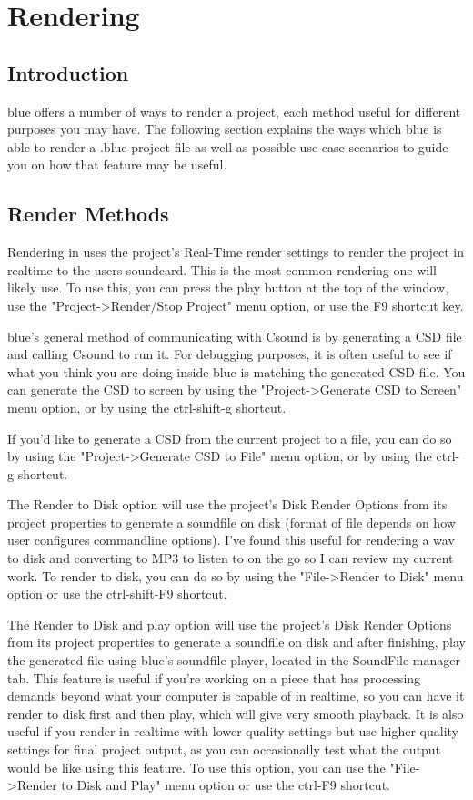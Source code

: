 \section{Rendering}\label{rendering}

\subsection{Introduction}

blue offers a number of ways to render a project, each method useful for
different purposes you may have. The following section explains the ways
which blue is able to render a .blue project file as well as possible
use-case scenarios to guide you on how that feature may be useful.

\subsection{Render Methods}

Rendering in uses the project's Real-Time render settings to render the
project in realtime to the users soundcard. This is the most common
rendering one will likely use. To use this, you can press the play
button at the top of the window, use the
"Project-\textgreater{}Render/Stop Project" menu option, or use the F9
shortcut key.

blue's general method of communicating with Csound is by generating a
CSD file and calling Csound to run it. For debugging purposes, it is
often useful to see if what you think you are doing inside blue is
matching the generated CSD file. You can generate the CSD to screen by
using the "Project-\textgreater{}Generate CSD to Screen" menu option, or
by using the ctrl-shift-g shortcut.

If you'd like to generate a CSD from the current project to a file, you
can do so by using the "Project-\textgreater{}Generate CSD to File" menu
option, or by using the ctrl-g shortcut.

The Render to Disk option will use the project's Disk Render Options
from its project properties to generate a soundfile on disk (format of
file depends on how user configures commandline options). I've found
this useful for rendering a wav to disk and converting to MP3 to listen
to on the go so I can review my current work. To render to disk, you can
do so by using the "File-\textgreater{}Render to Disk" menu option or
use the ctrl-shift-F9 shortcut.

The Render to Disk and play option will use the project's Disk Render
Options from its project properties to generate a soundfile on disk and
after finishing, play the generated file using blue's soundfile player,
located in the SoundFile manager tab. This feature is useful if you're
working on a piece that has processing demands beyond what your computer
is capable of in realtime, so you can have it render to disk first and
then play, which will give very smooth playback. It is also useful if
you render in realtime with lower quality settings but use higher
quality settings for final project output, as you can occasionally test
what the output would be like using this feature. To use this option,
you can use the "File-\textgreater{}Render to Disk and Play" menu option
or use the ctrl-F9 shortcut.

